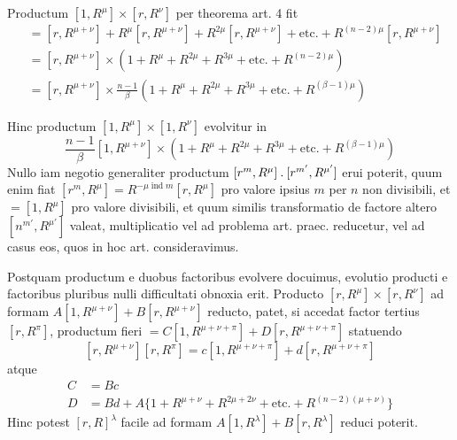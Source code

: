 Productum $[1,R^\mu]\times[r,R^\nu]$ per theorema art. 4 fit
\[
\begin{aligned}
&=[r,R^{\mu+\nu}]+R^\mu[r,R^{\mu+\nu}]+R^{2\mu}[r,R^{\mu+\nu}]+\text{etc.}+R^{(n-2)\mu}[r,R^{\mu+\nu}]\\
&=[r,R^{\mu+\nu}]\times(1+R^\mu+R^{2\mu}+R^{3\mu}+\text{etc.}+R^{(n-2)\mu})\\
&=[r,R^{\mu+\nu}]\times\frac{n-1}\beta(1+R^\mu+R^{2\mu}+R^{3\mu}+\text{etc.}+R^{(\beta-1)\mu})
\end{aligned}
\]

%
Hinc productum $[1,R^\mu]\times[1,R^\nu]$ evolvitur in
\[
\frac{n-1}\beta[1,R^{\mu+\nu}]\times(1+R^\mu+R^{2\mu}+R^{3\mu}+\text{etc.}+R^{(\beta-1)\mu})
\]
Nullo iam negotio generaliter productum $[r^m,R^\mu]\mathbin{.}[r^{m'},R^{\mu'}]$ erui poterit, quum enim fiat $[r^m,R^\mu]=R^{-\mu\operatorname{ind}m}[r,R^\mu]$ pro valore ipsius $m$ per $n$ non divisibili, et $=[1,R^\mu]$ pro valore divisibili, et quum similis transformatio de factore altero $[n^{m'},R^{\mu'}]$ valeat, multiplicatio vel ad problema art. praec. reducetur, vel ad casus eos, quos in hoc art. consideravimus.

Postquam productum e duobus factoribus evolvere docuimus, evolutio producti e factoribus pluribus nulli difficultati obnoxia erit. Producto $[r,R^\mu]\times[r,R^\nu]$ ad formam $A[1,R^{\mu+\nu}]+B[r,R^{\mu+\nu}]$ reducto, patet, si accedat factor tertius $[r,R^\pi]$, productum fieri $=C[1,R^{\mu+\nu+\pi}]+D[r,R^{\mu+\nu+\pi}]$ statuendo
\[
[r,R^{\mu+\nu}][r,R^\pi]=c[1,R^{\mu+\nu+\pi}]+d[r,R^{\mu+\nu+\pi}]
\]
atque
\[
\begin{aligned}
C&=Bc\\
D&=Bd+A\{1+R^{\mu+\nu}+R^{2\mu+2\nu}+\text{etc.}+R^{(n-2)(\mu+\nu)}\}
\end{aligned}
\]
Hinc potest $[r,R]^\lambda$ facile ad formam $A[1,R^\lambda]+B[r,R^\lambda]$ reduci poterit.

